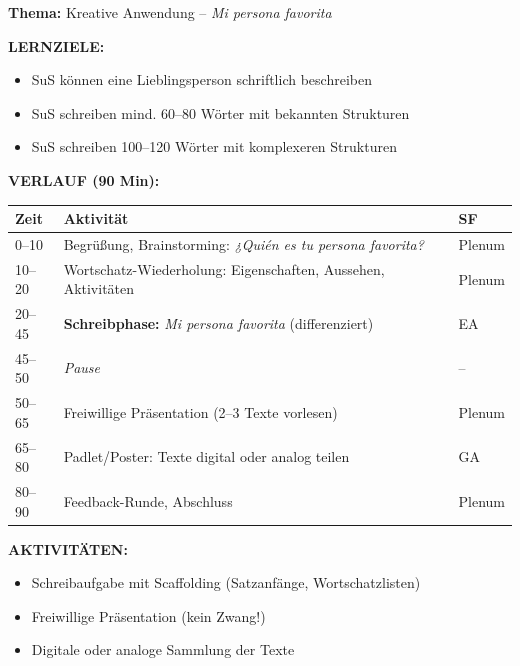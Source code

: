 \documentclass[11pt, a4paper]{article}
\newcommand{\es}[1]{\textcolor{spanisch}{\textit{#1}}}
\begin{document}
\begin{pufferbox}[title={DS 8 -- PUFFER: Creatividad y Juego (Di, 27.01.2026)}]

\textbf{Thema:} Kreative Anwendung -- \es{Mi persona favorita}

\vspace{0.3cm}


\vspace{0.3cm}

\textbf{LERNZIELE:}
\begin{itemize}[leftmargin=1.5em, nosep]
    \item[Alle:] SuS können eine Lieblingsperson schriftlich beschreiben
    \item[\textcolor{gruppeA}{A:}] SuS schreiben mind. 60--80 Wörter mit bekannten Strukturen
    \item[\textcolor{gruppeB}{B:}] SuS schreiben 100--120 Wörter mit komplexeren Strukturen
\end{itemize}

\vspace{0.2cm}

\textbf{VERLAUF (90 Min):}

\begin{tabular}{|p{1.2cm}|p{9cm}|p{3.5cm}|}
\hline
\rowcolor{hellgrau}
\textbf{Zeit} & \textbf{Aktivität} & \textbf{SF} \\
\hline
0--10 & Begrüßung, Brainstorming: \es{¿Quién es tu persona favorita?} & Plenum \\
\hline
10--20 & Wortschatz-Wiederholung: Eigenschaften, Aussehen, Aktivitäten & Plenum \\
\hline
20--45 & \textbf{Schreibphase:} \es{Mi persona favorita} (differenziert) & EA \\
\hline
45--50 & \textit{Pause} & -- \\
\hline
50--65 & Freiwillige Präsentation (2--3 Texte vorlesen) & Plenum \\
\hline
65--80 & Padlet/Poster: Texte digital oder analog teilen & GA \\
\hline
80--90 & Feedback-Runde, Abschluss & Plenum \\
\hline
\end{tabular}

\vspace{0.2cm}

\textbf{AKTIVITÄTEN:}
\begin{itemize}[leftmargin=1.5em, nosep]
    \item Schreibaufgabe mit Scaffolding (Satzanfänge, Wortschatzlisten)
    \item Freiwillige Präsentation (kein Zwang!)
    \item Digitale oder analoge Sammlung der Texte
\end{itemize}


\end{pufferbox}
\end{document}
